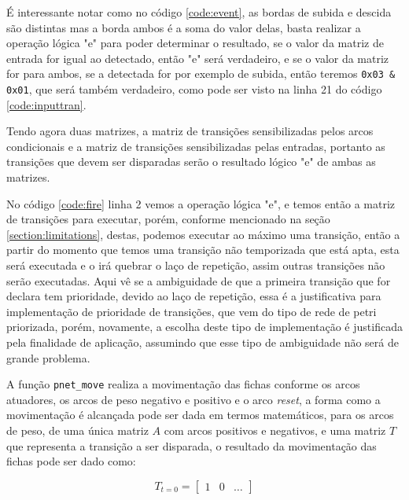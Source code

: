 

É interessante notar como no código \ref{code:event}, as bordas de subida e descida são distintas mas a borda ambos é a soma do valor delas, basta realizar a operação lógica "e" para poder determinar o resultado, se o valor da matriz de entrada for igual ao detectado, então "e" será verdadeiro, e se o valor da matriz for para ambos, se a detectada for por exemplo de subida, então teremos \lstinline{0x03 & 0x01}, que será também verdadeiro, como pode ser visto na linha 21 do código \ref{code:inputtran}.

Tendo agora duas matrizes, a matriz de transições sensibilizadas pelos arcos condicionais e a matriz de transições sensibilizadas pelas entradas, portanto as transições que devem ser disparadas serão o resultado lógico "e" de ambas as matrizes.



No código \ref{code:fire} linha 2 vemos a operação lógica "e", e temos então a matriz de transições para executar, porém, conforme mencionado na seção \ref{section:limitations}, destas, podemos executar ao máximo uma transição, então a partir do momento que temos uma transição não temporizada que está apta, esta será executada e o irá quebrar o laço de repetição, assim outras transições não serão executadas. Aqui vê se a ambiguidade de que a primeira transição que for declara tem prioridade, devido ao laço de repetição, essa é a justificativa para implementação de prioridade de transições, que vem do tipo de rede de petri priorizada, porém, novamente, a escolha deste tipo de implementação é justificada pela finalidade de aplicação, assumindo que esse tipo de ambiguidade não será de grande problema. 

A função \lstinline{pnet_move} realiza a movimentação das fichas conforme os arcos atuadores, os arcos de peso negativo e positivo e o arco \textit{reset}, a forma como a movimentação é alcançada pode ser dada em termos matemáticos, para os arcos de peso, de uma única matriz $A$ com arcos positivos e negativos, e uma matriz $T$ que representa a transição a ser disparada, o resultado da movimentação das fichas pode ser dado como: 

$$
T_{t=0} = \begin{bmatrix}
	1 & 0 & \dots
\end{bmatrix}
$$

